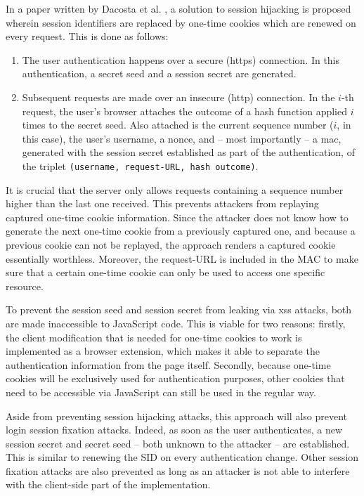 In a paper written by Dacosta et al. \cite{Dacosta2011}, a solution to session hijacking is proposed wherein session identifiers are replaced by one-time cookies which are renewed on every request. This is done as follows:
\begin{enumerate}
	\item The user authentication happens over a secure (\gls{https}) connection. In this authentication, a secret seed and a session secret are generated.
	\item Subsequent requests are made over an insecure (\gls{http}) connection. In the $i$-th request, the user's browser attaches the outcome of a hash function  applied $i$ times to the secret seed. Also attached is the current sequence number ($i$, in this case), the user's username, a nonce, and -- most importantly -- a \gls{mac}, generated with the session secret established as part of the authentication, of the triplet \texttt{(username, request-URL, hash outcome)}.
\end{enumerate}
It is crucial that the server only allows requests containing a sequence number higher than the last one received. This prevents attackers from replaying captured one-time cookie information. Since the attacker does not know how to generate the next one-time cookie from a previously captured one, and because a previous cookie can not be replayed, the approach renders a captured cookie essentially worthless. Moreover, the request-URL is included in the MAC to make sure that a certain one-time cookie can only be used to access one specific resource.

To prevent the session seed and session secret from leaking via \gls{xss} attacks, both are made inaccessible to JavaScript code. This is viable for two reasons: firstly, the client modification that is needed for one-time cookies to work is implemented as a browser extension, which makes it able to separate the authentication information from the page itself. Secondly, because one-time cookies will be exclusively used for authentication purposes, other cookies that need to be accessible via JavaScript can still be used in the regular way.

Aside from preventing session hijacking attacks, this approach will also prevent login session fixation attacks. Indeed, as soon as the user authenticates, a new session secret and secret seed -- both unknown to the attacker -- are established. This is similar to renewing the SID on every authentication change. Other session fixation attacks are also prevented as long as an attacker is not able to interfere with the client-side part of the implementation.

